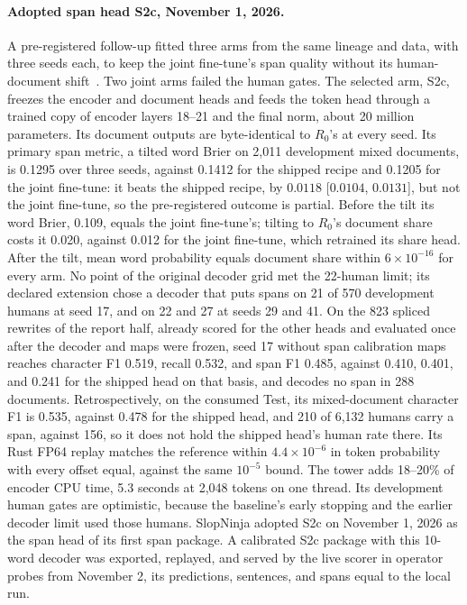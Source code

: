 \paragraph{Adopted span head S2c, November 1, 2026.}\label{s2c-evidence}
A pre-registered follow-up fitted three arms from the same lineage and data,
with three seeds each, to keep the joint fine-tune's span quality without its
human-document shift~\cite{spansresults}. Two joint arms failed the human
gates. The selected arm, S2c, freezes the encoder and document heads and feeds
the token head through a trained copy of encoder layers 18--21 and the final
norm, about 20 million parameters. Its document outputs are byte-identical
to \(R_0\)'s at every seed. Its primary span metric, a tilted word Brier on
2,011 development mixed documents, is 0.1295 over three seeds, against 0.1412
for the shipped recipe and 0.1205 for the joint fine-tune: it beats the shipped
recipe, by \(0.0118\) [\(0.0104\), \(0.0131\)], but not the joint fine-tune,
so the pre-registered outcome is partial. Before the tilt its word Brier, 0.109,
equals the joint fine-tune's; tilting to \(R_0\)'s document share costs it
0.020, against 0.012 for the joint fine-tune, which retrained its share head.
After the tilt, mean word probability equals document share within
\(6\times10^{-16}\) for every arm. No point of the original decoder grid
met the 22-human limit; its declared extension chose a decoder that puts spans
on 21 of 570 development humans at seed 17, and on 22 and 27 at seeds 29 and 41.
On the 823 spliced rewrites of the report half, already scored for the other
heads and evaluated once after the decoder and maps were frozen, seed 17
without span calibration maps reaches character F1 0.519, recall 0.532, and
span F1 0.485, against 0.410, 0.401, and 0.241 for the shipped head on that
basis, and decodes no span in 288 documents. Retrospectively, on the
consumed Test, its mixed-document character F1 is 0.535, against 0.478 for the
shipped head, and 210 of 6,132 humans carry a span, against 156, so it does not
hold the shipped head's human rate there. Its Rust FP64 replay matches the
reference within \(4.4\times10^{-6}\) in token probability with every offset
equal, against the same \(10^{-5}\) bound. The tower adds 18--20\% of encoder
CPU time, 5.3 seconds at 2,048 tokens on one thread. Its development human gates
are optimistic, because the baseline's early stopping and the earlier decoder
limit used those humans. SlopNinja adopted S2c on November 1, 2026 as the span
head of its first span package. A calibrated S2c package with this 10-word
decoder was exported, replayed, and served by the live scorer in operator
probes from November 2, its predictions, sentences, and spans equal to the
local run.


